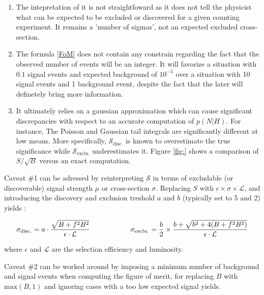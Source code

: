     \begin{enumerate}
        \item The intepretation of it is not straightfoward as it does not tell the
              physicist what can be expected to be excluded or discovered
              for a given counting experiment. It remains a 'number of sigmas', not an
              expected excluded cross-section.
        \item The formula \ref{FoM} does not contain any constrain regarding the fact that
              the observed number of events will be an integer. It will favorize a situation
              with $0.1$ signal events and expected background of $10^{-5}$ over a
              situation with 10 signal events and 1 background event, despite the fact that
              the later will definetely bring more information.
        \item It ultimately relies on a gaussian approximation which can cause significant
              discrepancies with respect to an accurate computation of $p(N|H)$. For instance,
              The Poisson and Gaussian tail integrals are significantly different at low
              means. More specifically, $\mathcal{S}_\text{disc.}$ is known to overestimate
              the true significance while $\mathcal{S}_\text{exclu.}$ underestimates it.
              Figure \ref{fig:} shows a comparison of $S/\sqrt{B}$ versus an exact
              computation.
    \end{enumerate}

    Caveat \#1 can be adressed by reinterpreting $\mathcal{S}$ in terms of excludable
    (or discoverable) signal strength $\mu$ or cross-section $\sigma$. Replacing
    $S$ with $\epsilon \times \sigma \times \mathcal{L}$, and introducing the discovery
    and exclusion treshold $a$ and $b$ (typically set to 5 and 2) yields :

    \begin{equation}
        \mathcal{\sigma}_\text{disc.} = a \cdot \frac{\sqrt{B+f^2B^2}}{\epsilon \cdot \mathcal{L}}
       \hspace*{2cm}
       \mathcal{\sigma}_\text{exclu.} = \frac{b}{2} \times \frac{b + \sqrt{b^2 + 4 (B + f^2B^2)}}{\epsilon \cdot \mathcal{L}}
       \label{FoM2}
    \end{equation}

    where $\epsilon$ and $\mathcal{L}$ are the selection efficiency and luminosity.

    Caveat \#2 can be worked around by imposing a minimum number of background and signal
    events when computing the figure of merit, for replacing $B$ with $\text{max}(B,1)$
    and ignoring cases with a too low expected signal yields.


